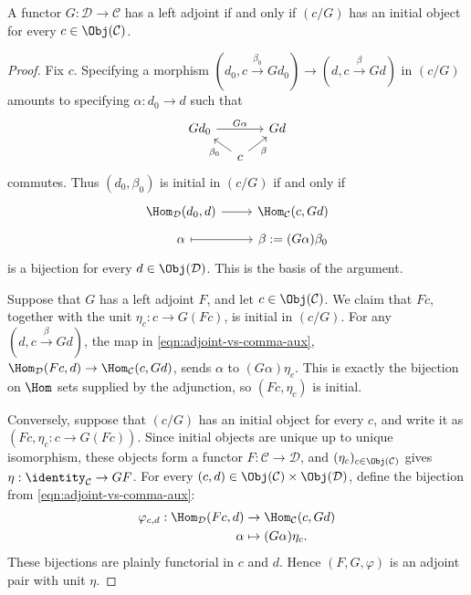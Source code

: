 \begin{lemma}\label{prop:adjoint-vs-comma}
	A functor $G:\mathcal{D}\to\mathcal{C}$ has a left adjoint if and only if
	$(c/G)$ has an initial object for every $c\in\Obj(\mathcal{C})$.
\end{lemma}
\begin{proof}
	Fix $c$. Specifying a morphism
	$(d_0,c\xrightarrow{\beta_0}Gd_0)\to(d,c\xrightarrow{\beta}Gd)$ in
	$(c/G)$ amounts to specifying $\alpha:d_0\to d$ such that
	\[\begin{tikzcd}[row sep=small, column sep=small]
		Gd_0 \arrow[rr, "G\alpha"] & & Gd \\
		& c \arrow[lu, "\beta_0"] \arrow[ru, "\beta"'] &
	\end{tikzcd}\]
	commutes. Thus $(d_0,\beta_0)$ is initial in $(c/G)$ if and only if
	\begin{equation}\label{eqn:adjoint-vs-comma-aux}
	\begin{tikzcd}[row sep=tiny]
		\Hom_{\mathcal{D}}(d_0, d) \arrow[r] & \Hom_{\mathcal{C}}(c, Gd) \\
		\alpha \arrow[mapsto, r] & \beta := (G\alpha) \beta_0
	\end{tikzcd}\end{equation}
	is a bijection for every $d\in\Obj(\mathcal{D})$. This is the basis of the
	argument.

	Suppose that $G$ has a left adjoint $F$, and let
	$c\in\Obj(\mathcal{C})$. We claim that $Fc$, together with the unit
	$\eta_c:c\to G(Fc)$, is initial in $(c/G)$. For any
	$(d,c\xrightarrow{\beta}Gd)$, the map in
	\eqref{eqn:adjoint-vs-comma-aux},
	$\Hom_{\mathcal{D}}(Fc,d)\to\Hom_{\mathcal{C}}(c,Gd)$, sends $\alpha$ to
	$(G\alpha)\eta_c$. This is exactly the bijection on $\Hom$ sets supplied
	by the adjunction, so $(Fc,\eta_c)$ is initial.

	Conversely, suppose that $(c/G)$ has an initial object for every $c$, and
	write it as $(Fc,\eta_c:c\to G(Fc))$. Since initial objects are unique up
	to unique isomorphism, these objects form a functor
	$F:\mathcal{C}\to\mathcal{D}$, and
	$(\eta_c)_{c\in\Obj(\mathcal{C})}$ gives
	$\eta:\identity_{\mathcal{C}}\to GF$. For every
	$(c,d)\in\Obj(\mathcal{C})\times\Obj(\mathcal{D})$, define the bijection
	from \eqref{eqn:adjoint-vs-comma-aux}:
	\begin{align*}
		\varphi_{c, d}: \Hom_{\mathcal{D}}(Fc, d) & \to \Hom_{\mathcal{C}}(c, Gd) \\
		\alpha & \mapsto (G\alpha) \eta_c.
	\end{align*}
	These bijections are plainly functorial in $c$ and $d$. Hence
	$(F,G,\varphi)$ is an adjoint pair with unit $\eta$.
\end{proof}


